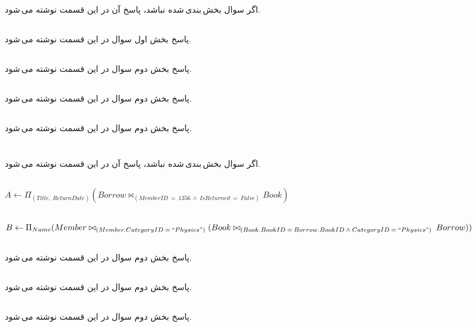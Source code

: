 \documentclass{article}
\begin{document}
\section{}
اگر سوال بخش\,بندی\,شده نباشد، پاسخ آن در این قسمت نوشته می\,شود.
\subsection{}
پاسخ بخش اول سوال در این قسمت نوشته می\,شود.
\subsection{}
پاسخ بخش دوم سوال در این قسمت نوشته می\,شود.
\subsection{}
پاسخ بخش دوم سوال در این قسمت نوشته می\,شود.
\subsection{}
پاسخ بخش دوم سوال در این قسمت نوشته می\,شود.

\section{}
اگر سوال بخش\,بندی\,شده نباشد، پاسخ آن در این قسمت نوشته می\,شود.
\subsection{}

$
A
\leftarrow
\Pi_{(Title,\:ReturnDate)}
(Borrow \bowtie_{(MemberID\:=\:1356\:\wedge\:IsReturned\:=\:False)} Book)
$

\subsection{}
$
B
\leftarrow
\Pi_{Name}
(Member
\bowtie_{(Member.CategoryID\:=\:``Physics")}
(Book \bowtie_{(Book.BookID\:=\:Borrow.BookID\:\wedge\:CategoryID\:=\:``Physics")}\:Borrow))
$
\subsection{}
پاسخ بخش دوم سوال در این قسمت نوشته می\,شود.
\subsection{}
پاسخ بخش دوم سوال در این قسمت نوشته می\,شود.
\subsection{}
پاسخ بخش دوم سوال در این قسمت نوشته می\,شود.
\end{document}
